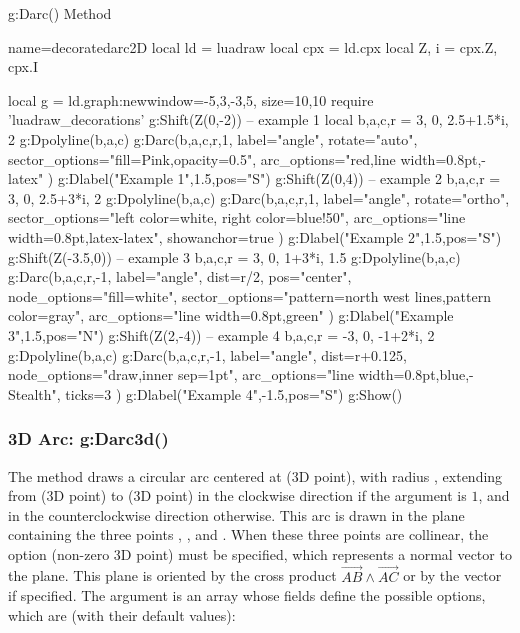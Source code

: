 \begin{demo}{g:Darc() Method}
\begin{luadraw}{name=decoratedarc2D}
local ld = luadraw
local cpx = ld.cpx
local Z, i = cpx.Z, cpx.I

local g = ld.graph:new{window={-5,3,-3,5}, size={10,10}}
require 'luadraw_decorations'
g:Shift(Z(0,-2)) -- example 1
local b,a,c,r = 3, 0, 2.5+1.5*i, 2
g:Dpolyline({b,a,c})
g:Darc(b,a,c,r,1, {
    label="angle", rotate="auto", 
    sector_options="fill=Pink,opacity=0.5", 
    arc_options="red,line width=0.8pt,-latex"  })
g:Dlabel("Example 1",1.5,{pos="S"})
g:Shift(Z(0,4))  -- example 2     
b,a,c,r = 3, 0, 2.5+3*i, 2    
g:Dpolyline({b,a,c})
g:Darc(b,a,c,r,1, {
    label="angle", rotate="ortho", 
    sector_options="left color=white, right color=blue!50", 
    arc_options="line width=0.8pt,latex-latex",
    showanchor=true  })
g:Dlabel("Example 2",1.5,{pos="S"})
g:Shift(Z(-3.5,0))  -- example 3     
b,a,c,r = 3, 0, 1+3*i, 1.5    
g:Dpolyline({b,a,c})
g:Darc(b,a,c,r,-1, {
    label="angle", dist=r/2, pos="center",
    node_options="fill=white",
    sector_options="pattern=north west lines,pattern color=gray", 
    arc_options="line width=0.8pt,green"   })
g:Dlabel("Example 3",1.5,{pos="N"})    
g:Shift(Z(2,-4)) -- example 4
b,a,c,r = -3, 0, -1+2*i, 2    
g:Dpolyline({b,a,c})
g:Darc(b,a,c,r,-1, {
    label="angle", dist=r+0.125, 
    node_options="draw,inner sep=1pt",
    arc_options="line width=0.8pt,blue,-Stealth",
    ticks=3  })
g:Dlabel("Example 4",-1.5,{pos="S"})
g:Show()
\end{luadraw}
\end{demo}


\subsubsection{3D Arc: g:Darc3d()}

The method  draws a circular arc centered at  (3D point), with radius , extending from  (3D point) to  (3D point) in the clockwise direction if the argument  is $1$, and in the counterclockwise direction otherwise. This arc is drawn in the plane containing the three points , , and . When these three points are collinear, the option  (non-zero 3D point) must be specified, which represents a normal vector to the plane. This plane is oriented by the cross product $\vec{AB}\wedge\vec{AC}$ or by the vector  if specified. The argument  is an array whose fields define the possible options, which are (with their default values):

